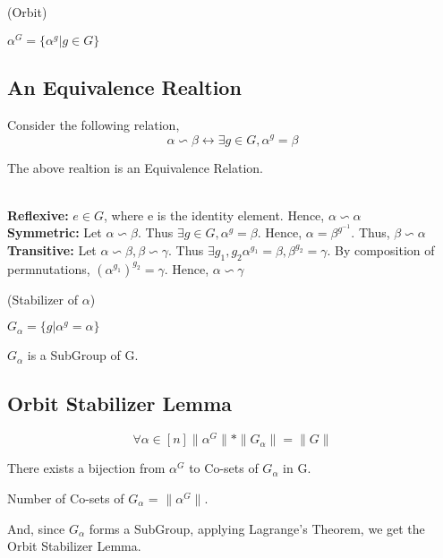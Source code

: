 \begin{definition}(Orbit)
\begin{center}
$\alpha^G = \{\alpha^g | g \in G\}$
\end{center}
\end{definition}

\subsection{An Equivalence Realtion}
Consider the following relation,
\[\alpha \backsim \beta \leftrightarrow \exists g \in G, \alpha^g = \beta\]

\begin{claim}
The above realtion is an Equivalence Relation. 
\end{claim}
\\
\textbf{Reflexive:} $e \in G$, where e is the identity element. Hence, $\alpha \backsim \alpha$ \\
\textbf{Symmetric:} Let $\alpha \backsim \beta$. Thus $\exists g \in G, \alpha^g = \beta$. Hence, $\alpha = \beta^{g^{-1}}$. Thus, $\beta \backsim \alpha$ \\
\textbf{Transitive:} Let $\alpha \backsim \beta, \beta \backsim \gamma$. Thus $\exists g_1, g_2 \alpha^{g_1} = \beta, \beta^{g_2} = \gamma$. By composition of permnutations, $(\alpha^{g_1})^{g_2} = \gamma$. Hence, $\alpha \backsim \gamma$


\begin{definition}(Stabilizer of $\alpha$)
\begin{center}
$G_{\alpha} = \{g | \alpha^g = \alpha\}$
\end{center}
\end{definition}

\begin{observation}
$G_{\alpha}$ is a SubGroup of G.
\end{observation}

\subsection{Orbit Stabilizer Lemma}
\[\forall \alpha \in [n] \|\alpha^G\|*\|G_{\alpha}\| = \|G\| \]
\begin{claim}
There exists a bijection from $\alpha^G$ to Co-sets of $G_{\alpha}$ in G.
\end{claim}
\begin{corollary}
Number of Co-sets of $G_{\alpha}$ = $\|\alpha^G\|$.
\end{corollary}
And, since $G_{\alpha}$ forms a SubGroup, applying Lagrange's Theorem, we get the Orbit Stabilizer Lemma.

